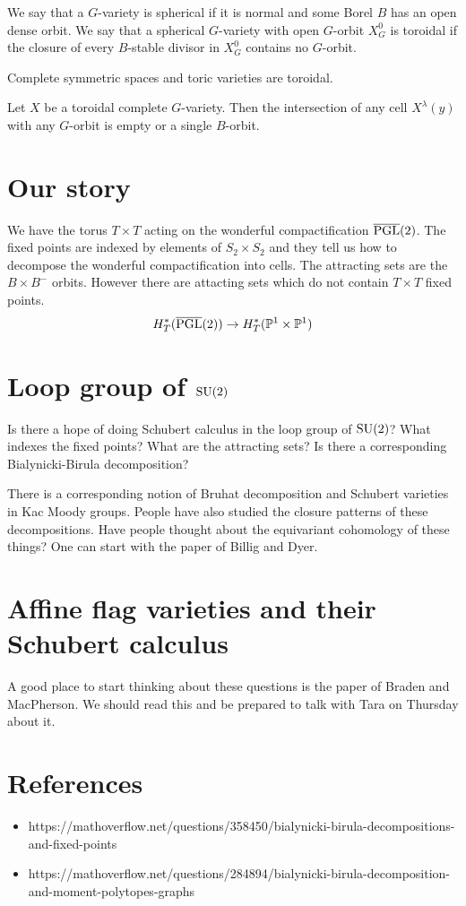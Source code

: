 \documentclass[12pt]{article}
\begin{document}
We say that a $G$-variety is spherical if it is normal and some Borel $B$ has an open dense orbit.
We say that a spherical $G$-variety with open $G$-orbit $X^0_G$ is toroidal if the closure of every 
$B$-stable divisor in $X^0_G$ contains no $G$-orbit.

\hfill

Complete symmetric spaces and toric varieties are toroidal.
\begin{theorem}
    Let $X$ be a toroidal complete $G$-variety. Then the intersection of any cell $X^\lambda(y)$ with any
    $G$-orbit is empty or a single $B$-orbit.
\end{theorem}

\section{Our story}
We have the torus $T\times T$ acting on the wonderful compactification $\overline {\operatorname{PGL}}(2)$. The fixed points are 
indexed by elements of $S_2\times S_2$ and they tell us how to decompose the wonderful compactification
into cells. The attracting sets are the $B\times B^-$ orbits. However there are attacting sets
which do not contain $T\times T$ fixed points. 
\begin{align*}
    H_T^*(\overline {\operatorname{PGL}}(2))\to H_T^*(\mathbb{P}^1\times \mathbb{P}^1)
\end{align*} 

\section{Loop group of $\operatorname{SU}(2)$}
Is there a hope of doing Schubert calculus in the loop group of $\operatorname{SU}(2)$? 
What indexes the fixed points? What are the attracting sets? Is there a corresponding Bialynicki-Birula decomposition?

\hfill

There is a corresponding notion of Bruhat decomposition and Schubert varieties in Kac Moody groups.
People have also studied the closure patterns of these decompositions. Have people thought
about the equivariant cohomology of these things? One can start with the paper of Billig and Dyer.

\section{Affine flag varieties and their Schubert calculus}
A good place to start thinking about these questions is the paper of Braden and MacPherson. We should read this 
and be prepared to talk with Tara on Thursday about it.

\section{References}
\begin{itemize}
    \item https://mathoverflow.net/questions/358450/bialynicki-birula-decompositions-and-fixed-points
    \item https://mathoverflow.net/questions/284894/bialynicki-birula-decomposition-and-moment-polytopes-graphs
\end{itemize}
\end{document}
